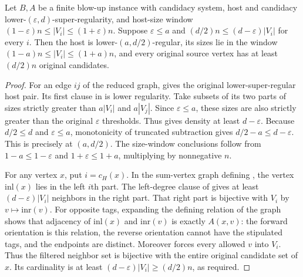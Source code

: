 \begin{lemma}
Let $B,A$ be a finite blow-up instance with candidacy system, host and
candidacy lower-$(\varepsilon,d)$-super-regularity, and host-size window
$(1-\varepsilon)n\leq |V_i|\leq(1+\varepsilon)n$. Suppose $\varepsilon\leq a$
and $(d/2)n\leq(d-\varepsilon)|V_i|$ for every $i$.
Then the host is lower-$(a,d/2)$-regular, its sizes lie in the window
$(1-a)n\leq |V_i|\leq(1+a)n$, and every original source vertex has at
least $(d/2)n$ original candidates.
\end{lemma}
\begin{proof}
For an edge $ij$ of the reduced graph, 
gives the original lower-super-regular host pair. Its first clause in
 is lower regularity.
Take subsets of its two parts of sizes strictly greater than $a|V_i|$
and $a|V_j|$. Since $\varepsilon\leq a$, these sizes are also strictly
greater than the original $\varepsilon$ thresholds. Thus
 gives density at least $d-\varepsilon$.
Because $d/2\leq d$ and $\varepsilon\leq a$, monotonicity of truncated
subtraction gives $d/2-a\leq d-\varepsilon$.
This is precisely  at $(a,d/2)$.
The size-window conclusions follow from $1-a\leq1-\varepsilon$
and $1+\varepsilon\leq1+a$, multiplying by nonnegative $n$.

For any vertex $x$, put $i=c_H(x)$. In the sum-vertex graph defining
, the vertex $\mathrm{inl}(x)$ lies
in the left $i$th part. The left-degree clause of
 gives at least
$(d-\varepsilon)|V_i|$ neighbors in the right part. That right part is
bijective with $V_i$ by $v\mapsto\mathrm{inr}(v)$.
For opposite tags, expanding the defining relation of the graph shows
that adjacency of $\mathrm{inl}(x)$ and $\mathrm{inr}(v)$ is exactly
$A(x,v)$: the forward orientation is this relation, the reverse
orientation cannot have the stipulated tags, and the endpoints are distinct.
Moreover  forces every allowed $v$ into $V_i$.
Thus the filtered neighbor set is bijective with the entire original
candidate set of $x$. Its cardinality is at least
$(d-\varepsilon)|V_i|\geq(d/2)n$, as required.
\end{proof}
